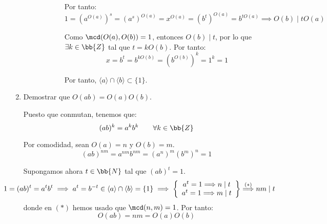 \begin{ejercicio}
\begin{enumerate}
\begin{description}
\begin{description}
                Por tanto:
                \begin{equation*}
                    1=(a^{O(a)})^s = (a^s)^{O(a)} = x^{O(a)} = (b^t)^{O(a)} = b^{tO(a)}\implies O(b)\mid tO(a)
                \end{equation*}

                Como $\mcd(O(a),O(b))=1$, entonces $O(b)\mid t$, por lo que $\exists k\in\bb{Z}$ tal que $t=kO(b)$. Por tanto:
                \begin{equation*}
                    x=b^t=b^{kO(b)}=(b^{O(b)})^k=1^k=1
                \end{equation*}

                Por tanto, $\langle a\rangle\cap \langle b\rangle\subset \{1\}$.
            \end{description}
        \end{description}

        \item Demostrar que $O(ab) = O(a)O(b)$.
        
        Puesto que conmutan, tenemos que:
        \begin{equation*}
            (ab)^k=a^kb^k\qquad \forall k\in\bb{Z}
        \end{equation*}

        Por comodidad, sean $O(a)=n$ y $O(b)=m$.
        \begin{equation*}
            (ab)^{nm}=a^{nm}b^{nm}=(a^n)^m(b^m)^n=1
        \end{equation*}

        Supongamos ahora $t\in \bb{N}$ tal que $(ab)^t=1$. 
        \begin{equation*}
            \hspace{-1cm}1=(ab)^t=a^tb^t\implies a^t=b^{-t}\in \langle a\rangle\cap \langle b\rangle=\{1\}\implies \left\{\begin{array}{c}
                a^t=1\Longrightarrow n\mid t\\
                a^t=1\Longrightarrow m\mid t
            \end{array}\right\}\stackrel{(\ast)}{\Longrightarrow} nm\mid t
        \end{equation*}
        donde en $(\ast)$ hemos usado que $\mcd(n,m)=1$. Por tanto:
        \begin{equation*}
            O(ab)=nm=O(a)O(b)
        \end{equation*}
    \end{enumerate}
\end{ejercicio}

